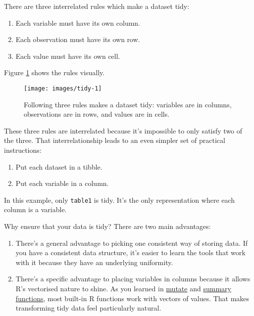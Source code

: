\documentclass[]{book}
\providecommand{\tightlist}{%
  \setlength{\itemsep}{0pt}\setlength{\parskip}{0pt}}
\begin{document}
There are three interrelated rules which make a dataset tidy:

\begin{enumerate}
\def\labelenumi{\arabic{enumi}.}
\tightlist
\item
  Each variable must have its own column.
\item
  Each observation must have its own row.
\item
  Each value must have its own cell.
\end{enumerate}

Figure \ref{fig:tidy-structure} shows the rules visually.

\begin{figure}

{\centering \texttt{[image: images/tidy-1]} 

}

\caption{Following three rules makes a dataset tidy: variables are in columns, observations are in rows, and values are in cells.}\label{fig:tidy-structure}
\end{figure}

These three rules are interrelated because it's impossible to only
satisfy two of the three. That interrelationship leads to an even
simpler set of practical instructions:

\begin{enumerate}
\def\labelenumi{\arabic{enumi}.}
\tightlist
\item
  Put each dataset in a tibble.
\item
  Put each variable in a column.
\end{enumerate}

In this example, only \texttt{table1} is tidy. It's the only
representation where each column is a variable.

Why ensure that your data is tidy? There are two main advantages:

\begin{enumerate}
\def\labelenumi{\arabic{enumi}.}
\item
  There's a general advantage to picking one consistent way of storing
  data. If you have a consistent data structure, it's easier to learn
  the tools that work with it because they have an underlying
  uniformity.
\item
  There's a specific advantage to placing variables in columns because
  it allows R's vectorised nature to shine. As you learned in
  \protect\hyperlink{mutate-funs}{mutate} and
  \protect\hyperlink{summary-funs}{summary functions}, most built-in R
  functions work with vectors of values. That makes transforming tidy
  data feel particularly natural.
\end{enumerate}
\end{document}
